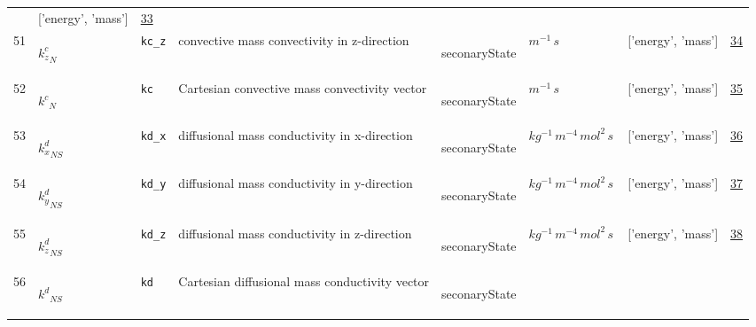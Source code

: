 \begin{longtable}{|p{1cm}|p{3cm}|p{3cm}|p{7cm}|p{3.0cm}|p{3cm}|p{2cm}|p{1cm}|}
             & ['energy', 'mass']
             & \hyperlink{"e:33"}{ 33 }
                 \\
    51
             & \hypertarget{"v:51"}{ $ {k^{c}_{z}}_{N} $}
             & \verb|kc_z|
             & convective mass convectivity in z-direction
             & \begin{lay}seconaryState \end{lay}
             & $ m^{-1} \,s \, $
             & ['energy', 'mass']
             & \hyperlink{"e:34"}{ 34 }
                 \\
    52
             & \hypertarget{"v:52"}{ $ {k^{c}}_{N} $}
             & \verb|kc|
             & Cartesian convective mass convectivity vector
             & \begin{lay}seconaryState \end{lay}
             & $ m^{-1} \,s \, $
             & ['energy', 'mass']
             & \hyperlink{"e:35"}{ 35 }
                 \\
    53
             & \hypertarget{"v:53"}{ $ {k^{d}_{x}}_{{N S}} $}
             & \verb|kd_x|
             & diffusional mass conductivity in x-direction
             & \begin{lay}seconaryState \end{lay}
             & $ kg^{-1} \,m^{-4} \,mol^{2} \,s \, $
             & ['energy', 'mass']
             & \hyperlink{"e:36"}{ 36 }
                 \\
    54
             & \hypertarget{"v:54"}{ $ {k^{d}_{y}}_{{N S}} $}
             & \verb|kd_y|
             & diffusional mass conductivity in y-direction
             & \begin{lay}seconaryState \end{lay}
             & $ kg^{-1} \,m^{-4} \,mol^{2} \,s \, $
             & ['energy', 'mass']
             & \hyperlink{"e:37"}{ 37 }
                 \\
    55
             & \hypertarget{"v:55"}{ $ {k^{d}_{z}}_{{N S}} $}
             & \verb|kd_z|
             & diffusional mass conductivity in z-direction
             & \begin{lay}seconaryState \end{lay}
             & $ kg^{-1} \,m^{-4} \,mol^{2} \,s \, $
             & ['energy', 'mass']
             & \hyperlink{"e:38"}{ 38 }
                 \\
    56
             & \hypertarget{"v:56"}{ $ {k^{d}}_{{N S}} $}
             & \verb|kd|
             & Cartesian diffusional mass conductivity vector
             & \begin{lay}seconaryState \end{lay}

\end{longtable}
